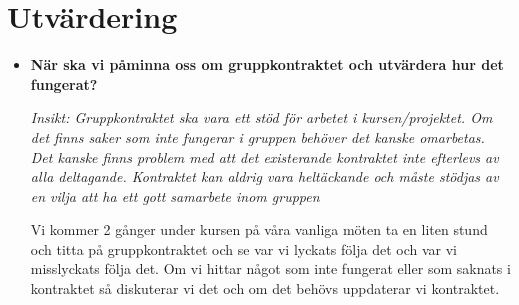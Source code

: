 \documentclass{mall}
\begin{document}
\section{Utvärdering}

\begin{itemize}
\item \textbf{När ska vi påminna oss om gruppkontraktet och utvärdera hur det fungerat?}

  \emph{Insikt: Gruppkontraktet ska vara ett stöd för arbetet i kursen/projektet. Om det finns saker som
    inte fungerar i gruppen behöver det kanske omarbetas. Det kanske finns problem med att det existerande
    kontraktet inte efterlevs av alla deltagande. Kontraktet kan aldrig vara heltäckande och måste stödjas
    av en vilja att ha ett gott samarbete inom gruppen}
  
  Vi kommer 2 gånger under kursen på våra vanliga möten ta en liten stund och titta på gruppkontraktet
  och se var vi lyckats följa det och var vi misslyckats följa det. Om vi hittar något som inte fungerat
  eller som saknats i kontraktet så diskuterar vi det och om det behövs uppdaterar vi kontraktet.


\end{itemize}
\end{document}

